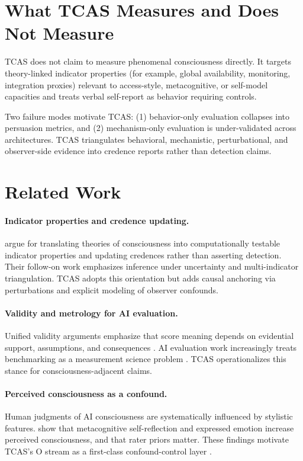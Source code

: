 \documentclass[letterpaper]{article}
\begin{document}
\section{What TCAS Measures and Does Not Measure}

TCAS does not claim to measure phenomenal consciousness directly. It targets theory-linked indicator properties (for example, global availability, monitoring, integration proxies) relevant to access-style, metacognitive, or self-model capacities and treats verbal self-report as behavior requiring controls.

Two failure modes motivate TCAS: (1) behavior-only evaluation collapses into persuasion metrics, and (2) mechanism-only evaluation is under-validated across architectures. TCAS triangulates behavioral, mechanistic, perturbational, and observer-side evidence into credence reports rather than detection claims.

\section{Related Work}

\paragraph{Indicator properties and credence updating.}
\citet{butlin2023} argue for translating theories of consciousness into computationally testable indicator properties and updating credences rather than asserting detection. Their follow-on work \citep{butlin2025} emphasizes inference under uncertainty and multi-indicator triangulation. TCAS adopts this orientation but adds causal anchoring via perturbations and explicit modeling of observer confounds.

\paragraph{Validity and metrology for AI evaluation.}
Unified validity arguments emphasize that score meaning depends on evidential support, assumptions, and consequences \citep{messick1995}. AI evaluation work increasingly treats benchmarking as a measurement science problem \citep{welty2019,perrier2025,wallach2025}. TCAS operationalizes this stance for consciousness-adjacent claims.

\paragraph{Perceived consciousness as a confound.}
Human judgments of AI consciousness are systematically influenced by stylistic features. \citet{kang2025} show that metacognitive self-reflection and expressed emotion increase perceived consciousness, and that rater priors matter. These findings motivate TCAS's O stream as a first-class confound-control layer \citep{gray2007,kang2025}.
\end{document}
